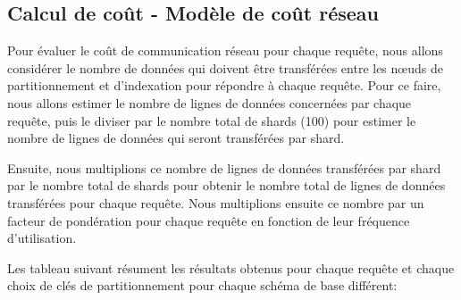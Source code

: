 \subsection{Calcul de coût - Modèle de coût réseau}
Pour évaluer le coût de communication réseau pour chaque requête, nous allons considérer le nombre de données qui doivent être transférées entre les nœuds de partitionnement et d'indexation pour répondre à chaque requête. Pour ce faire, nous allons estimer le nombre de lignes de données concernées par chaque requête, puis le diviser par le nombre total de shards (100) pour estimer le nombre de lignes de données qui seront transférées par shard.

Ensuite, nous multiplions ce nombre de lignes de données transférées par shard par le nombre total de shards pour obtenir le nombre total de lignes de données transférées pour chaque requête. Nous multiplions ensuite ce nombre par un facteur de pondération pour chaque requête en fonction de leur fréquence d'utilisation.

Les tableau suivant résument les résultats obtenus pour chaque requête et chaque choix de clés de partitionnement pour chaque schéma de base différent:

